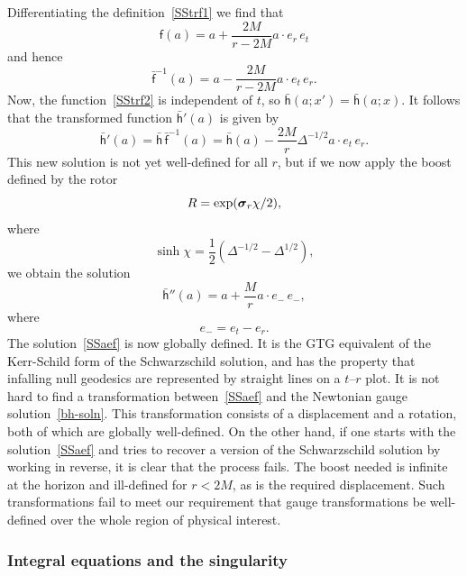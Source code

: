 \documentclass[a4paper]{article}
\numberwithin{equation}{section}
\newcommand{\dt}{\! \cdot \!}
\newcommand{\half}{{\textstyle \frac{1}{2}}}
\newcommand{\sig}{\mbox{\boldmath $\sigma$}}
\newcommand{\bsig}{\mbox{\boldmath $\sig$}}
\newcommand{\sigr}{\bsig_r}
\newcommand{\lif}{\mathsf{f}}
\newcommand{\lbf}{\bar{\mathsf{f}}}
\newcommand{\lbh}{\bar{\mathsf{h}}}
\newcommand{\ho}{\lbh}
\newcommand{\fo}{\lbf}
\newcommand{\fu}{\lif}
\begin{document}
Differentiating the definition~\eqref{SStrf1} we find that
%
\begin{equation}
\fu(a) = a + \frac{2M}{r-2M} a \dt e_r \, e_t 
\end{equation}
%
and hence
%
\begin{equation}
\fo^{-1} (a) =  a - \frac{2M}{r-2M} a \dt e_t \, e_r.
\end{equation}
%
Now, the function~\eqref{SStrf2} is independent of $t$, so
$\ho(a;x')=\ho(a;x)$.  It follows that the transformed function
$\ho'(a)$ is given by
%
\begin{equation}
\ho'(a) = \ho\,\fo^{-1} (a) = \ho(a) - \frac{2M}{r} \Delta^{-1/2}  a \dt
e_t \, e_r. 
\end{equation} 
%
This new solution is not yet well-defined for all $r$, but if we now
apply the boost defined by the rotor
%
\begin{equation}
R = \exp(\sigr \chi/2),
\end{equation} 
%
where 
%
\begin{equation}
\sinh\!\chi = \half(\Delta^{-1/2} - \Delta^{1/2}),
\end{equation}
%
we obtain the solution
%
\begin{equation}
\ho''(a) = a + \frac{M}{r} a \dt e_- \, e_-,
\label{SSaef}
\end{equation}
%
where
%
\begin{equation}
e_- = e_t - e_r.
\end{equation}
%
The solution~\eqref{SSaef} is now globally defined.  It is the GTG
equivalent of the Kerr-Schild form of the Schwarzschild solution, and
has the property that infalling null geodesics are represented by
straight lines on a $t$--$r$ plot.  It is not hard to find a
transformation between~\eqref{SSaef} and the Newtonian gauge
solution~\eqref{bh-soln}.  This transformation consists of a displacement
and a rotation, both of which are globally well-defined.  On the other
hand, if one starts with the solution~\eqref{SSaef} and tries to recover a
version of the Schwarzschild solution by working in reverse, it is
clear that the process fails.  The boost needed is infinite at the
horizon and ill-defined for $r<2M$, as is the required displacement.
Such transformations fail to meet our requirement that gauge
transformations be well-defined over the whole region of physical
interest.



\subsubsection*{Integral equations and the singularity}
\end{document}
